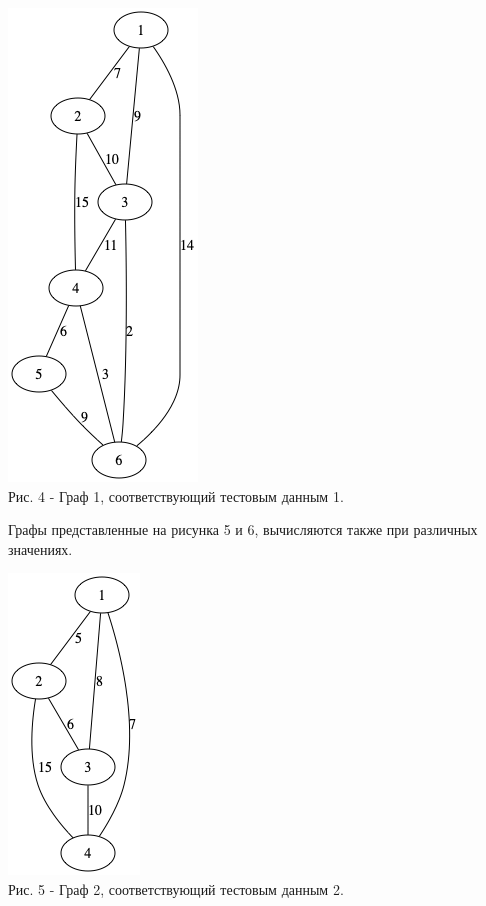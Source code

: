\documentclass[a4paper,14pt]{article} %
\begin{document}
	\begin{center}
		\includegraphics[scale = 0.8]{graph} \\ Рис.  4 - Граф 1, соответствующий тестовым данным 1.  
	\end{center}
	
	Графы представленные на рисунка 5 и 6, вычисляются также при различных значениях. 
	
	\begin{center}
		\includegraphics[scale = 0.8]{graph1} \\ Рис.  5 - Граф 2, соответствующий тестовым данным 2.  
	\end{center}
	
\end{document}
